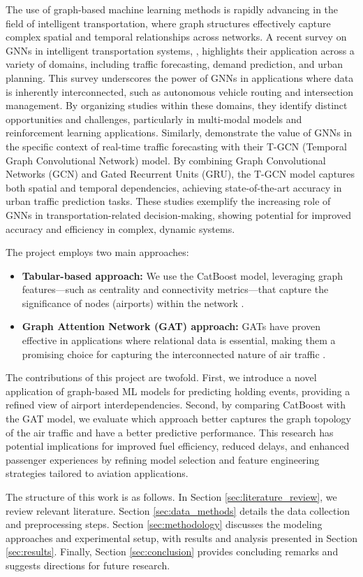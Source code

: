 The use of graph-based machine learning methods is rapidly advancing in the field of intelligent transportation, where graph structures effectively capture complex spatial and temporal relationships across networks. A recent survey on GNNs in intelligent transportation systems,  , highlights their application across a variety of domains, including traffic forecasting, demand prediction, and urban planning. This survey underscores the power of GNNs in applications where data is inherently interconnected, such as autonomous vehicle routing and intersection management. By organizing studies within these domains, they identify distinct opportunities and challenges, particularly in multi-modal models and reinforcement learning applications. Similarly,  demonstrate the value of GNNs in the specific context of real-time traffic forecasting with their T-GCN (Temporal Graph Convolutional Network) model. By combining Graph Convolutional Networks (GCN) and Gated Recurrent Units (GRU), the T-GCN model captures both spatial and temporal dependencies, achieving state-of-the-art accuracy in urban traffic prediction tasks. These studies exemplify the increasing role of GNNs in transportation-related decision-making, showing potential for improved accuracy and efficiency in complex, dynamic systems.

The project employs two main approaches:

\begin{itemize}
    \item \textbf{Tabular-based approach:} We use the CatBoost model, leveraging graph features—such as centrality and connectivity metrics—that capture the significance of nodes (airports) within the network \cite{prokhorenkova2018catboost}.
    \item \textbf{Graph Attention Network (GAT) approach:} GATs have proven effective in applications where relational data is essential, making them a promising choice for capturing the interconnected nature of air traffic \cite{velickovic2017graph}.
\end{itemize}

The contributions of this project are twofold. First, we introduce a novel application of graph-based ML models for predicting holding events, providing a refined view of airport interdependencies. Second, by comparing CatBoost with the GAT model, we evaluate which approach better captures the graph topology of the air traffic and have a better predictive performance. This research has potential implications for improved fuel efficiency, reduced delays, and enhanced passenger experiences by refining model selection and feature engineering strategies tailored to aviation applications.

The structure of this work is as follows. In Section \ref{sec:literature_review}, we review relevant literature. Section \ref{sec:data_methods} details the data collection and preprocessing steps. Section \ref{sec:methodology} discusses the modeling approaches and experimental setup, with results and analysis presented in Section \ref{sec:results}. Finally, Section \ref{sec:conclusion} provides concluding remarks and suggests directions for future research.
